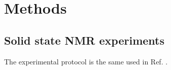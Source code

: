 \documentclass[aps,prl,superscriptaddress,twocolumn]{revtex4}
\begin{document}




\section{Methods}

\subsection{Solid state NMR experiments}
The experimental protocol is the same used in Ref. .
\end{document}
